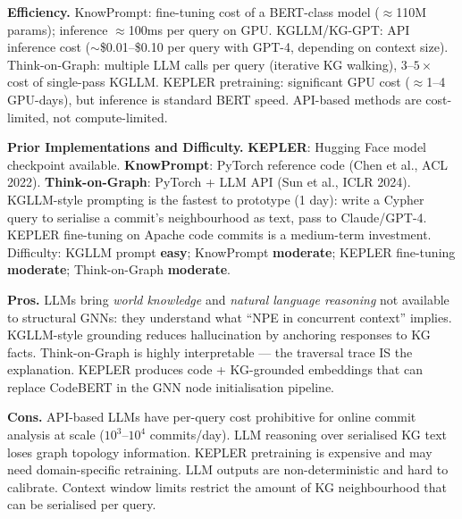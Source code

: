 \documentclass[12pt,a4paper]{article}
\begin{document}
\begin{effbox}
\textbf{Efficiency.}
KnowPrompt: fine-tuning cost of a BERT-class model ($\approx$110M params);
inference $\approx$100ms per query on GPU. KGLLM/KG-GPT: API inference cost
($\sim$\$0.01--\$0.10 per query with GPT-4, depending on context size).
Think-on-Graph: multiple LLM calls per query (iterative KG walking),
$3$--$5\times$ cost of single-pass KGLLM. KEPLER pretraining: significant
GPU cost ($\approx$1--4 GPU-days), but inference is standard BERT speed.
API-based methods are cost-limited, not compute-limited.
\end{effbox}

\begin{implbox}
\textbf{Prior Implementations and Difficulty.}
\textbf{KEPLER}: Hugging Face model checkpoint available.
\textbf{KnowPrompt}: PyTorch reference code (Chen et al., ACL 2022).
\textbf{Think-on-Graph}: PyTorch + LLM API (Sun et al., ICLR 2024).
KGLLM-style prompting is the fastest to prototype (1 day): write a Cypher
query to serialise a commit's neighbourhood as text, pass to Claude/GPT-4.
KEPLER fine-tuning on Apache code commits is a medium-term investment.
Difficulty: KGLLM prompt \textbf{easy}; KnowPrompt \textbf{moderate};
KEPLER fine-tuning \textbf{moderate}; Think-on-Graph \textbf{moderate}.
\end{implbox}

\begin{prosbox}
\textbf{Pros.}
LLMs bring \emph{world knowledge} and \emph{natural language reasoning}
not available to structural GNNs: they understand what ``NPE in concurrent
context'' implies. KGLLM-style grounding reduces hallucination by anchoring
responses to KG facts. Think-on-Graph is highly interpretable --- the
traversal trace IS the explanation. KEPLER produces code + KG-grounded
embeddings that can replace CodeBERT in the GNN node initialisation
pipeline.
\end{prosbox}

\begin{consbox}
\textbf{Cons.}
API-based LLMs have per-query cost prohibitive for online commit analysis
at scale ($10^3$--$10^4$ commits/day). LLM reasoning over serialised KG text
loses graph topology information. KEPLER pretraining is expensive and may
need domain-specific retraining. LLM outputs are non-deterministic and hard
to calibrate. Context window limits restrict the amount of KG neighbourhood
that can be serialised per query.
\end{consbox}
\end{document}
